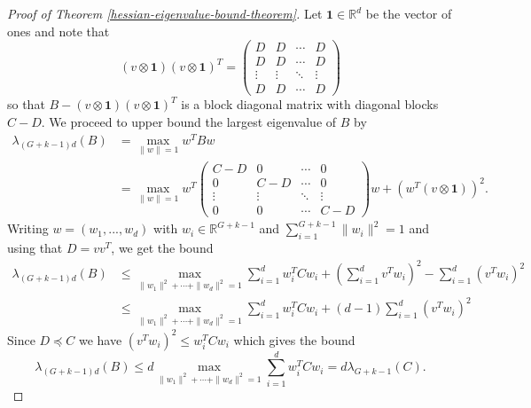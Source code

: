 \documentclass[12pt]{caltech_thesis}
\numberwithin{equation}{section}
\begin{document}
\begin{proof}[Proof of Theorem \ref{hessian-eigenvalue-bound-theorem}]
    Let $\mathbf{1}\in \mathbb{R}^d$ be the vector of ones and note that
    \begin{equation}
        (v\otimes \mathbf{1})(v\otimes \mathbf{1})^T = \begin{pmatrix}
            D & D & \cdots & D\\
            D & D & \cdots & D\\
            \vdots & \vdots & \ddots & \vdots\\
            D & D & \cdots & D
        \end{pmatrix}
    \end{equation}
    so that $B-(v\otimes \mathbf{1})(v\otimes \mathbf{1})^T$ is a block diagonal matrix with diagonal blocks $C - D$. We proceed to upper bound the largest eigenvalue of $B$ by
    \begin{equation}\begin{split}
        \lambda_{(G+k-1)d}(B) &= \max_{\|w\| = 1} w^TBw \\
        &= \max_{\|w\| = 1} w^T\begin{pmatrix}
            C-D & 0 & \cdots & 0\\
            0 & C-D & \cdots & 0\\
            \vdots & \vdots & \ddots & \vdots\\
            0 & 0 & \cdots & C-D
        \end{pmatrix}w + (w^T(v\otimes \mathbf{1}))^2.
    \end{split}
    \end{equation}
    Writing $w = (w_1,...,w_d)$ with $w_i\in \mathbb{R}^{G+k-1}$ and $\sum_{i=1}^{G+k-1} \|w_i\|^2 = 1$ and using that $D = vv^T$, we get the bound
    \begin{equation}
    \begin{split}
        \lambda_{(G+k-1)d}(B) &\leq \max_{\|w_1\|^2 + \cdots + \|w_d\|^2 = 1} \sum_{i=1}^d w_i^TCw_i + \left(\sum_{i=1}^d v^Tw_i\right)^2 - \sum_{i=1}^d (v^Tw_i)^2\\
        &\leq \max_{\|w_1\|^2 + \cdots + \|w_d\|^2 = 1} \sum_{i=1}^d w_i^TCw_i + (d-1)\sum_{i=1}^d (v^Tw_i)^2
    \end{split}
    \end{equation}
    Since $D \preceq C$ we have $(v^Tw_i)^2 \leq w_i^TCw_i$ which gives the bound
    \begin{equation}
        \lambda_{(G+k-1)d}(B) \leq d\max_{\|w_1\|^2 + \cdots + \|w_d\|^2 = 1} \sum_{i=1}^d w_i^TCw_i = d\lambda_{G+k-1}(C).
    \end{equation}

\end{proof}
\end{document}
